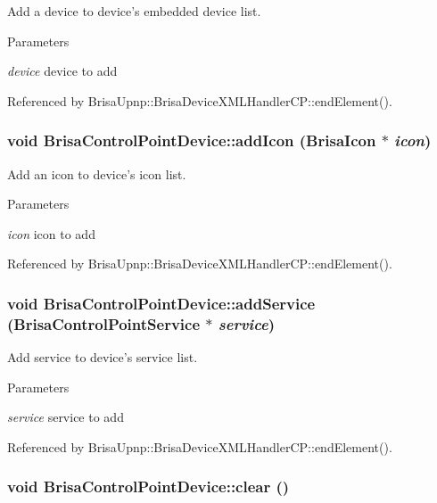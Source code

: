 Add a device to device's embedded device list. 
\begin{DoxyParams}{Parameters}
\item[{\em device}]device to add \end{DoxyParams}


Referenced by BrisaUpnp::BrisaDeviceXMLHandlerCP::endElement().\hypertarget{classBrisaUpnp_1_1BrisaControlPointDevice_afd25b6a2446a81820f271170251873ff}{
\subsubsection[{addIcon}]{\setlength{\rightskip}{0pt plus 5cm}void BrisaControlPointDevice::addIcon ({\bf BrisaIcon} $\ast$ {\em icon})}}
\label{classBrisaUpnp_1_1BrisaControlPointDevice_afd25b6a2446a81820f271170251873ff}


Add an icon to device's icon list. 
\begin{DoxyParams}{Parameters}
\item[{\em icon}]icon to add \end{DoxyParams}


Referenced by BrisaUpnp::BrisaDeviceXMLHandlerCP::endElement().\hypertarget{classBrisaUpnp_1_1BrisaControlPointDevice_a8951736e30cad71d0e2e978fa20024f8}{
\subsubsection[{addService}]{\setlength{\rightskip}{0pt plus 5cm}void BrisaControlPointDevice::addService ({\bf BrisaControlPointService} $\ast$ {\em service})}}
\label{classBrisaUpnp_1_1BrisaControlPointDevice_a8951736e30cad71d0e2e978fa20024f8}


Add service to device's service list. 
\begin{DoxyParams}{Parameters}
\item[{\em service}]service to add \end{DoxyParams}


Referenced by BrisaUpnp::BrisaDeviceXMLHandlerCP::endElement().\hypertarget{classBrisaUpnp_1_1BrisaControlPointDevice_a95a5e678c394445f428eda266a2e5864}{
\subsubsection[{clear}]{\setlength{\rightskip}{0pt plus 5cm}void BrisaControlPointDevice::clear ()}}
\label{classBrisaUpnp_1_1BrisaControlPointDevice_a95a5e678c394445f428eda266a2e5864}


